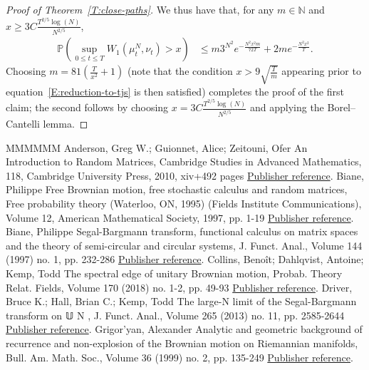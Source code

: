 \documentclass[11pt]{article}
\theoremstyle{definition}
\numberwithin{equation}{section}
\numberwithin{figure}{section}
\numberwithin{table}{section}
\newcommand{\Prob}{\mathbb{P}}
\begin{document}
\begin{proof}[Proof of Theorem~\ref{T:close-paths}]
We thus have that, for any $m\in\mathbb{N}$ and $x\ge 3C\frac{T^{2/5}\log(N)}{N^{2/5}}$,
\begin{align*}
\Prob\left(\sup_{0\le t\le
T}W_1(\mu^N_t,\nu_t)>x\right)&
\le m3^{N^2}e^{-\frac{N^2x^2m}{72T}}+2me^{-\frac{N^2x^2}{T}}.
\end{align*}
Choosing $m=81\left(\frac{T}{x^2}+1\right)$ (note that the condition $x>9\sqrt{\frac{T}{m}}$ appearing prior to equation~\ref{E:reduction-to-tjs} is then satisfied) completes the proof of the first claim; the second follows by choosing $x=3C\frac{T^{2/5}\log(N)}{N^{2/5}}$ and applying the Borel--Cantelli lemma.
\end{proof}



\begin{thebibliography}{MMMMMM}
 Anderson, Greg W.; Guionnet, Alice; Zeitouni, Ofer An Introduction to Random Matrices, Cambridge Studies in Advanced Mathematics, 118, Cambridge University Press, 2010, xiv+492 pages \href{https://ahl.centre-mersenne.org/item/AHL_2018__1__247_0/#AGZ}{Publisher reference}.
 Biane, Philippe Free Brownian motion, free stochastic calculus and random matrices, Free probability theory (Waterloo, ON, 1995) (Fields Institute Communications), Volume 12, American Mathematical Society, 1997, pp. 1-19 \href{https://ahl.centre-mersenne.org/item/AHL_2018__1__247_0/#Biane1997}{Publisher reference}.
 Biane, Philippe Segal-Bargmann transform, functional calculus on matrix spaces and the theory of semi-circular and circular systems, J. Funct. Anal., Volume 144 (1997) no. 1, pp. 232-286 \href{https://ahl.centre-mersenne.org/item/AHL_2018__1__247_0/#Biane1997-2}{Publisher reference}.
 Collins, Benoît; Dahlqvist, Antoine; Kemp, Todd The spectral edge of unitary Brownian motion, Probab. Theory Relat. Fields, Volume 170 (2018) no. 1-2, pp. 49-93 \href{https://ahl.centre-mersenne.org/item/AHL_2018__1__247_0/#CDK2016}{Publisher reference}.
 Driver, Bruce K.; Hall, Brian C.; Kemp, Todd The large-N limit of the Segal-Bargmann transform on 𝕌 N , J. Funct. Anal., Volume 265 (2013) no. 11, pp. 2585-2644 \href{https://ahl.centre-mersenne.org/item/AHL_2018__1__247_0/#DHK2013}{Publisher reference}.
 Grigor’yan, Alexander Analytic and geometric background of recurrence and non-explosion of the Brownian motion on Riemannian manifolds, Bull. Am. Math. Soc., Volume 36 (1999) no. 2, pp. 135-249 \href{https://ahl.centre-mersenne.org/item/AHL_2018__1__247_0/#Grigoryan1999}{Publisher reference}.

\end{thebibliography}
\end{document}
